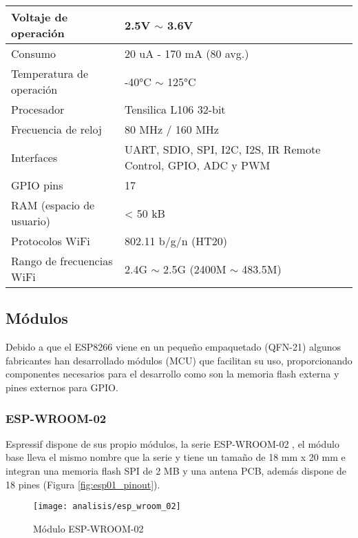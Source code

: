 \documentclass[../proyecto.tex]{subfiles}
\begin{document}
\begin{center}
\begin{tabular}{ |l|m{20em}| }
\hline
Voltaje de operación      & 2.5V $\sim$ 3.6V          \\ \hline
Consumo                   & 20 uA - 170 mA (80 avg.)  \\ \hline
Temperatura de operación  & -40°C $\sim$ 125°C        \\ \hline
Procesador                & Tensilica L106 32-bit     \\ \hline
Frecuencia de reloj       & 80 MHz / 160 MHz          \\ \hline
Interfaces                & UART, SDIO, SPI, I2C, I2S, IR Remote Control, GPIO, ADC y PWM                           \\ \hline
GPIO pins                 & 17                        \\ \hline
RAM (espacio de usuario)  & < 50 kB                     \\ \hline
Protocolos WiFi           & 802.11 b/g/n (HT20)       \\ \hline
Rango de frecuencias WiFi & 2.4G $\sim$ 2.5G (2400M $\sim$ 483.5M) \\ \hline
\end{tabular}
\end{center}


\subsection{Módulos}

Debido a que el ESP8266 viene en un pequeño empaquetado (QFN-21) algunos fabricantes han desarrollado módulos (MCU) que facilitan su uso, proporcionando componentes necesarios para el desarrollo como son la memoria flash externa y pines externos para GPIO.\\

\subsubsection{ESP-WROOM-02}

Espressif dispone de sus propio módulos, la serie ESP-WROOM-02 \cite{espwroom02_overview}, el módulo base \cite{espwroom02_datasheet} lleva el mismo nombre que la serie y tiene un tamaño de 18 mm x 20 mm e integran una memoria flash SPI de 2 MB y una antena PCB, además dispone de 18 pines (Figura \ref{fig:esp01_pinout}).\\

\begin{figure}[h]
\centering
\texttt{[image: analisis/esp\_wroom\_02]}
\caption{Módulo ESP-WROOM-02}
\label{fig:esp_wrom_02}
\end{figure}
\end{document}
